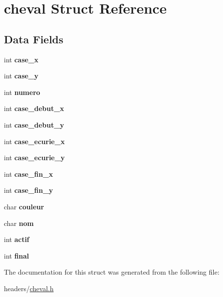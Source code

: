 \hypertarget{structcheval}{}\section{cheval Struct Reference}
\label{structcheval}
\subsection*{Data Fields}
\begin{DoxyCompactItemize}
\item 
\mbox{\label{structcheval_a9f377a8dd57e14dfded1062800cde75f}} 
int {\bfseries case\+\_\+x}
\item 
\mbox{\label{structcheval_ac18b913237f5ced558ebf6156a60712a}} 
int {\bfseries case\+\_\+y}
\item 
\mbox{\label{structcheval_a2c30f43104974e72e2809fb4569804b0}} 
int {\bfseries numero}
\item 
\mbox{\label{structcheval_a8e4785b5ea1bc051a2d9dfcced459ce0}} 
int {\bfseries case\+\_\+debut\+\_\+x}
\item 
\mbox{\label{structcheval_aa1f9557a41e248128d501f2aba6c014d}} 
int {\bfseries case\+\_\+debut\+\_\+y}
\item 
\mbox{\label{structcheval_a829b29f3adbb16259a57286c5c410ad0}} 
int {\bfseries case\+\_\+ecurie\+\_\+x}
\item 
\mbox{\label{structcheval_a7bdeb84be04ea0899760931956f8fecb}} 
int {\bfseries case\+\_\+ecurie\+\_\+y}
\item 
\mbox{\label{structcheval_a8bb71c4a91c486bb57a52794c9f612ba}} 
int {\bfseries case\+\_\+fin\+\_\+x}
\item 
\mbox{\label{structcheval_affaa660d3dfc4a615d709be3812241af}} 
int {\bfseries case\+\_\+fin\+\_\+y}
\item 
\mbox{\label{structcheval_a7d939a822f708b17b81e028a43f4594e}} 
char {\bfseries couleur}
\item 
\mbox{\label{structcheval_a3d94f2cfb74184db3a6ef28254445005}} 
char {\bfseries nom}
\item 
\mbox{\label{structcheval_ac7af358ee4cf412c08955b8fc6cdd053}} 
int {\bfseries actif}
\item 
\mbox{\label{structcheval_a1e99bf3e2d9897e1875b181360a61a50}} 
int {\bfseries final}
\end{DoxyCompactItemize}


The documentation for this struct was generated from the following file\+:\begin{DoxyCompactItemize}
\item 
headers/\mbox{\hyperlink{cheval_8h}{cheval.\+h}}\end{DoxyCompactItemize}
